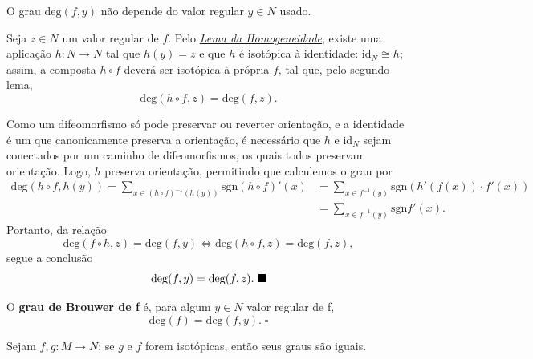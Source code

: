 \documentclass[../differential_topology.tex]{subfiles}
\begin{document}
\begin{theorem*}
	O grau \(\mathrm{deg}(f, y)\) não depende do valor regular \(y\in N\) usado.
\end{theorem*}
\begin{proof*}
	Seja \(z\in N\) um valor regular de \(f\). Pelo \hyperlink{homogeneity_lemma}{\textit{Lema da Homogeneidade}}, existe uma aplicação \(h:N\rightarrow N\) tal que \(h(y) = z\) e que \(h\) é isotópica à identidade: \(\mathrm{id}_{N}\cong h\); assim, a composta \(h\circ f\) deverá ser isotópica à própria \(f\), tal que, pelo segundo lema,
	\[
		\mathrm{deg}(h\circ f, z) = \mathrm{deg}(f, z).
	\]

	Como um difeomorfismo só pode preservar ou reverter orientação, e a identidade é um que canonicamente preserva a orientação, é necessário que \(h\) e \(\mathrm{id}_{N}\) sejam conectados por um caminho de difeomorfismos, os quais todos preservam orientação.
	Logo, \(h\) preserva orientação, permitindo que calculemos o grau por
	\begin{align*}
		\mathrm{deg}(h\circ f, h(y)) = \sum\limits_{x\in (h\circ f)^{-1}(h(y))}^{} \mathrm{sgn}(h\circ f)'(x) & = \sum\limits_{x\in f^{-1}(y)}^{}\mathrm{sgn}(h'(f(x))\cdot f'(x)) \\
		                                                                                                      & =\sum\limits_{x\in f^{-1}(y)}^{}\mathrm{sgn}f'(x).
	\end{align*}
	Portanto, da relação
	\[
		\mathrm{deg}(f\circ h, z) = \mathrm{deg}(f, y) \Longleftrightarrow \mathrm{deg}(h\circ f, z) = \mathrm{deg}(f, z),
	\]
	segue a conclusão
	\[
		\mathrm{deg}(f, y) = \mathrm{deg}(f, z). \text{ $\blacksquare$}
	\]

\end{proof*}
\begin{def*}
	O \textbf{grau de Brouwer de f} é, para algum \(y\in N\) valor regular de f,
	\[
		\mathrm{deg}(f) = \mathrm{deg}(f, y).\; \square
	\]
\end{def*}
\begin{theorem*}
	Sejam \(f, g:M\rightarrow N\); se \(g\) e \(f\) forem isotópicas, então seus graus são iguais.
\end{theorem*}
\end{document}
